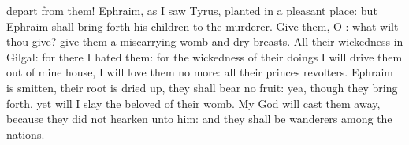 {depart from them!
Ephraim, as I
saw
Tyrus,
{}
planted in a pleasant
place: but
Ephraim shall bring
forth his
children to the
murderer.
Give them, O
{}: what wilt thou
give?
give them a
miscarrying
womb and
dry
breasts.
All their
wickedness
{} in
Gilgal: for there I
hated them: for the
wickedness of their
doings I will drive them
out of mine
house, I will
love them no
more: all their
princes
{}
revolters.
Ephraim is
smitten, their
root is dried
up, they shall
bear no
fruit: yea, though they bring
forth, yet will I
slay
{} the
beloved
{} of their
womb.
My
God will cast them
away, because they did not
hearken unto him: and they shall be
wanderers among the
nations.

}
